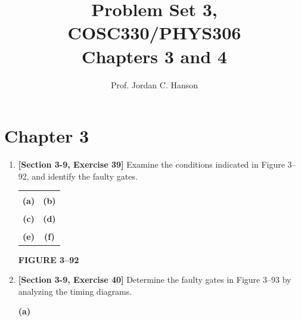 \documentclass[11pt]{article}
\begin{document}
\twocolumn

\title{Problem Set 3, COSC330/PHYS306\\
Chapters 3 and 4}
\author{Prof. Jordan C. Hanson}
\maketitle

\section{Chapter 3}

\begin{enumerate}

\item \textbf{[Section 3-9, Exercise 39]}
Examine the conditions indicated in Figure 3--92, and identify the faulty gates.

\begin{center}
\begin{tabular}{cc}
 &
 \\
\textbf{(a)} & \textbf{(b)} \\[0.15cm]
 &
 \\
\textbf{(c)} & \textbf{(d)} \\[0.15cm]
 &
 \\
\textbf{(e)} & \textbf{(f)}
\end{tabular}

\vspace{0.08cm}
\textbf{FIGURE 3--92}
\end{center}

\item \textbf{[Section 3-9, Exercise 40]}
Determine the faulty gates in Figure 3--93 by analyzing the timing diagrams.

\begin{center}

\hfill


\textbf{(a)}

\vspace{0.12cm}

\hfill



\end{center}
\end{enumerate}
\end{document}
